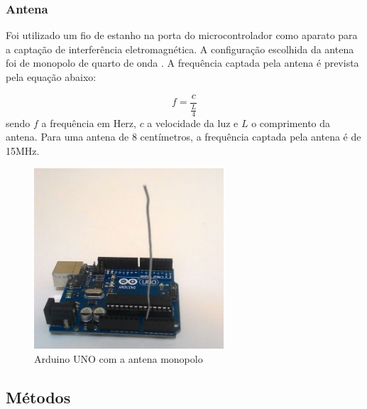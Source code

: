 \subsubsection{Antena}

Foi utilizado um fio de estanho na porta do microcontrolador como aparato para a captação de interferência eletromagnética. A configuração escolhida da antena foi de monopolo de quarto de onda \cite{Balanis2005}.
A frequência captada pela antena é prevista pela equação abaixo:

\begin{equation}
   f = \frac{c}{\frac{L}{4}}
  \end{equation}
sendo $f$ a frequência em Herz, $c$ a velocidade da luz e $L$ o comprimento da antena. Para uma antena de 8 centímetros, a frequência
captada pela antena é de 15MHz.
 \begin{figure}[H]
 	\label{fig2}
 	\begin{centering}
 		\includegraphics[width = 200pt]{img/arduino2.png}
 		\caption{Arduino UNO com a antena monopolo}
 	\end{centering}	
 		
 \end{figure}

\subsection{Métodos}